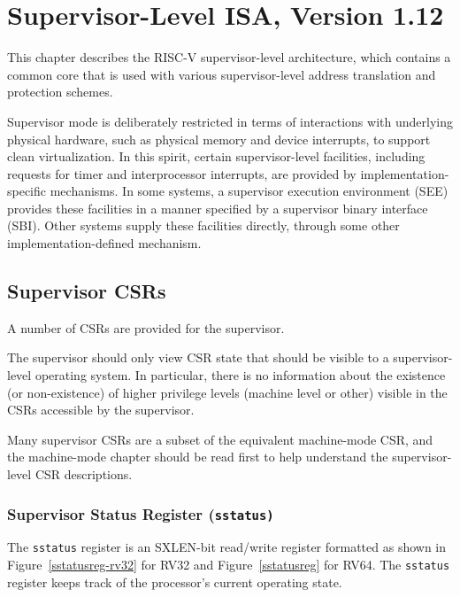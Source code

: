 \chapter{Supervisor-Level ISA, Version 1.12}
\label{supervisor}

This chapter describes the RISC-V supervisor-level architecture, which
contains a common core that is used with various supervisor-level
address translation and protection schemes.

\begin{commentary}
Supervisor mode is deliberately restricted in terms of interactions
with underlying physical hardware, such as physical memory and device
interrupts, to support clean virtualization.
In this spirit, certain supervisor-level facilities, including requests for
timer and interprocessor interrupts, are provided by implementation-specific
mechanisms.  In some systems, a supervisor execution environment (SEE)
provides these facilities in a manner specified by a supervisor binary
interface (SBI).  Other systems supply these facilities directly, through some
other implementation-defined mechanism.
\end{commentary}

\section{Supervisor CSRs}

A number of CSRs are provided for the supervisor.

\begin{commentary}
The supervisor should only view CSR state that should be visible to a
supervisor-level operating system.  In particular, there is no
information about the existence (or non-existence) of higher privilege
levels (machine level or other) visible in the CSRs accessible by the
supervisor.

Many supervisor CSRs are a subset of the equivalent machine-mode CSR,
and the machine-mode chapter should be read first to help understand
the supervisor-level CSR descriptions.
\end{commentary}

\subsection{Supervisor Status Register (\tt sstatus)}
\label{sstatus}


The {\tt sstatus} register is an SXLEN-bit read/write register
formatted as shown in Figure~\ref{sstatusreg-rv32} for RV32 and
Figure~\ref{sstatusreg} for RV64.  The {\tt sstatus}
register keeps track of the processor's current operating state.

